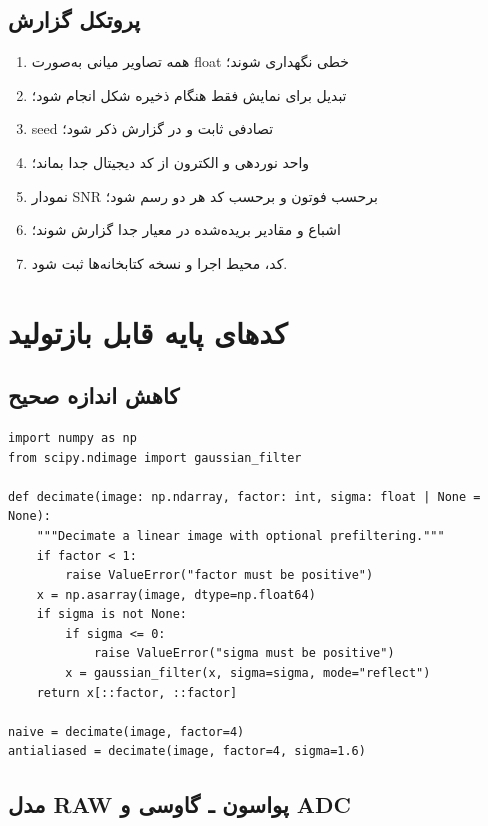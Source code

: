\documentclass[12pt,openany,oneside]{book}
\begin{document}
\subsection{پروتکل گزارش}

\begin{enumerate}
\item همه تصاویر میانی به‌صورت float خطی نگهداری شوند؛
\item تبدیل برای نمایش فقط هنگام ذخیره شکل انجام شود؛
\item seed تصادفی ثابت و در گزارش ذکر شود؛
\item واحد نوردهی و الکترون از کد دیجیتال جدا بماند؛
\item نمودار SNR برحسب فوتون و برحسب کد هر دو رسم شود؛
\item اشباع و مقادیر بریده‌شده در معیار جدا گزارش شوند؛
\item کد، محیط اجرا و نسخه کتابخانه‌ها ثبت شود.
\end{enumerate}

\section{کدهای پایه قابل بازتولید}

\subsection{کاهش اندازه صحیح}

\begin{LTR}
\begin{lstlisting}
import numpy as np
from scipy.ndimage import gaussian_filter

def decimate(image: np.ndarray, factor: int, sigma: float | None = None):
    """Decimate a linear image with optional prefiltering."""
    if factor < 1:
        raise ValueError("factor must be positive")
    x = np.asarray(image, dtype=np.float64)
    if sigma is not None:
        if sigma <= 0:
            raise ValueError("sigma must be positive")
        x = gaussian_filter(x, sigma=sigma, mode="reflect")
    return x[::factor, ::factor]

naive = decimate(image, factor=4)
antialiased = decimate(image, factor=4, sigma=1.6)
\end{lstlisting}
\end{LTR}

\subsection{مدل RAW پواسون ـ گاوسی و ADC}
\end{document}
